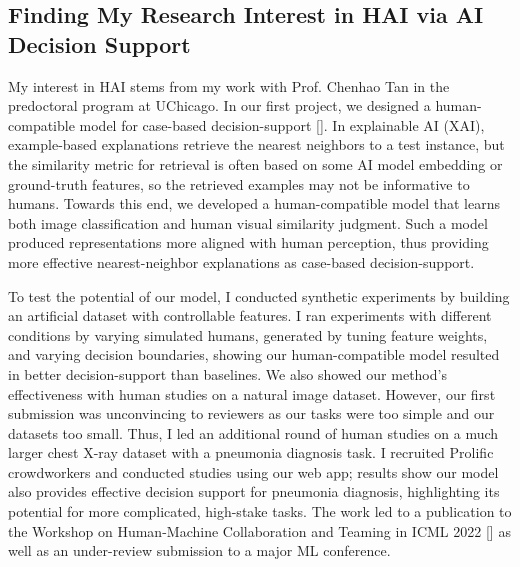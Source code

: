 \subsection*{Finding My Research Interest in HAI via AI Decision Support}









My interest in HAI stems from my work with Prof. Chenhao Tan in the predoctoral program at UChicago. In our first project, we designed a human-compatible model for case-based decision-support
[]. 
In explainable AI (XAI), example-based explanations retrieve the nearest neighbors to a test instance, but the similarity metric for retrieval is often based on some AI model embedding or ground-truth features, so the retrieved examples may not be informative to humans. 
Towards this end, we developed a human-compatible model that learns both image classification and human visual similarity judgment. Such a model produced representations more aligned with human perception, thus providing more effective nearest-neighbor explanations as case-based decision-support.



To test the potential of our model, I conducted synthetic experiments by building an artificial dataset with controllable features. I ran experiments with different conditions by varying simulated humans, generated by tuning feature weights, and varying decision boundaries, showing our human-compatible model resulted in better decision-support than baselines. We also showed our method's effectiveness with human studies on a natural image dataset. However, our first submission was unconvincing to reviewers as our tasks were too simple and our datasets too small. Thus, I led an additional round of human studies on a much larger chest X-ray dataset with a pneumonia diagnosis task. I recruited Prolific crowdworkers and conducted studies using our web app; results show our model also provides effective decision support for pneumonia diagnosis, highlighting its potential for more complicated, high-stake tasks. 
The work led to a publication to the Workshop on Human-Machine Collaboration and Teaming in ICML 2022 [] as well as an under-review submission to a major ML conference.


